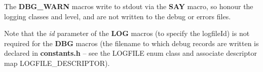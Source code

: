 \medskip
The \textbf{DBG\_WARN} macros write to stdout via the \textbf{SAY} macro, so honour the logging classes and level, and are not written to the debug or errors files.

Note that the \textit{id} parameter of the \textbf{LOG} macros (to specify the logfileId) is not required for the \textbf{DBG} macros (the filename to which debug records are written is declared in \textbf{constants.h} -- see the LOGFILE enum class and associate descriptor map LOGFILE\_DESCRIPTOR).